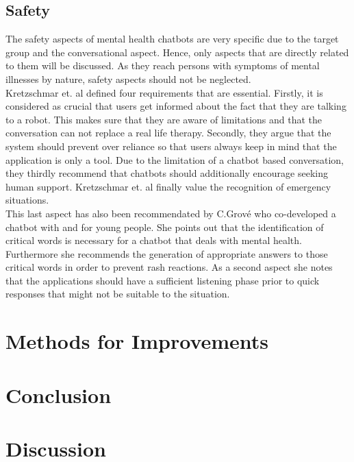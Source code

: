 \documentclass[sigconf, nonacm]{acmart}
\begin{document}
\subsection{Safety}
The safety aspects of mental health chatbots are very specific due to the target group and the conversational aspect. Hence, only aspects that are directly related to them will be discussed.
As they reach persons with symptoms of mental illnesses by nature, safety aspects should not be neglected. 
\\
Kretzschmar et. al defined four requirements that are essential. Firstly, it is considered as crucial that users get informed about the fact that they are talking to a robot. This makes sure that they are aware of limitations and that the conversation can not replace a real life therapy.
Secondly, they argue that the system should prevent over reliance so that users always keep in mind that the application is only a tool. 
Due to the limitation of a chatbot based conversation, they thirdly recommend that chatbots should additionally encourage seeking human support.
Kretzschmar et. al finally value the recognition of emergency situations.\cite{Kretzschmar2019}
\\
This last aspect has also been recommendated by C.Grové who co-developed a chatbot with and for young people. She points out that the identification of critical words is necessary for a chatbot that deals with mental health.
Furthermore she recommends the generation of appropriate answers to those critical words in order to prevent rash reactions.
As a second aspect she notes that the applications should have a sufficient listening phase prior to quick responses that might not be suitable to the situation.\cite{Grove2021}  


\section{Methods for Improvements}

\section{Conclusion}

\section{Discussion}





\appendix
\end{document}
